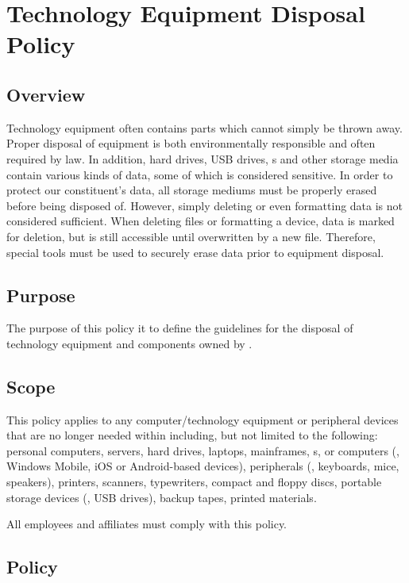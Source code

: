 \chapter{Technology Equipment Disposal Policy}
\CommonIntroduction
\section{Overview}
Technology equipment often contains parts which cannot simply be thrown away.  Proper disposal of equipment is both environmentally responsible and often required by law.  
In addition, hard drives, USB drives, \cdrom{}s and other storage media contain various kinds of \CompanyName{} data, some of which is considered sensitive.  
In order to protect our constituent's data, all storage mediums must be properly erased before being disposed of.  
However, simply deleting or even formatting data is not considered sufficient.  
When deleting files or formatting a device, data is marked for deletion, but is still accessible until overwritten by a new file.  
Therefore, special tools must be used to securely erase data prior to equipment disposal.  
\section{Purpose}
The purpose of this policy it to define the guidelines for the disposal of technology equipment and components owned by \CompanyName{}. 
\section{Scope}
This policy applies to any computer/technology equipment or peripheral devices that are no longer needed within \CompanyName{} including, but not limited to the following:  personal computers, servers, hard drives, laptops, mainframes, \smartphone{}s, or \handheld{} computers (\ie, Windows Mobile, iOS\oxford{} or Android-based devices), peripherals (\ie, keyboards, mice, speakers), printers, scanners, typewriters, compact and floppy discs, portable storage devices (\ie, USB drives), backup tapes, printed materials\ins{, \etc}. 

All \CompanyName{} employees and affiliates must comply with this policy. 
\section{Policy}
